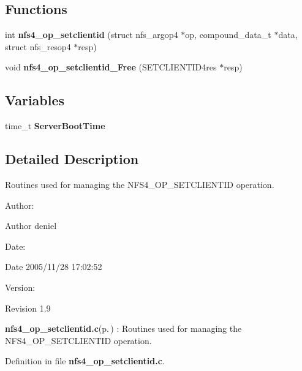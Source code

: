 \subsection*{Functions}
\begin{CompactItemize}
\item 
int {\bf nfs4\_\-op\_\-setclientid} (struct nfs\_\-argop4 $\ast$op, compound\_\-data\_\-t $\ast$data, struct nfs\_\-resop4 $\ast$resp)
\item 
void {\bf nfs4\_\-op\_\-setclientid\_\-Free} (SETCLIENTID4res $\ast$resp)
\end{CompactItemize}
\subsection*{Variables}
\begin{CompactItemize}
\item 
time\_\-t {\bf Server\-Boot\-Time}
\end{CompactItemize}


\subsection{Detailed Description}
Routines used for managing the NFS4\_\-OP\_\-SETCLIENTID operation. 

\begin{Desc}
\item[Author:]\begin{Desc}
\item[Author]deniel \end{Desc}
\end{Desc}
\begin{Desc}
\item[Date:]\begin{Desc}
\item[Date]2005/11/28 17:02:52 \end{Desc}
\end{Desc}
\begin{Desc}
\item[Version:]\begin{Desc}
\item[Revision]1.9 \end{Desc}
\end{Desc}
{\bf nfs4\_\-op\_\-setclientid.c}{\rm (p.\,\pageref{nfs4__op__setclientid_8c})} : Routines used for managing the NFS4\_\-OP\_\-SETCLIENTID operation.

Definition in file {\bf nfs4\_\-op\_\-setclientid.c}.

